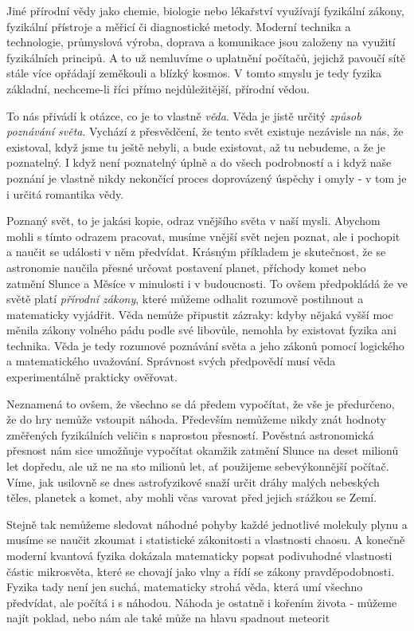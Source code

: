       Jiné přírodní vědy jako chemie, biologie nebo lékařství využívají fyzikální zákony, fyzikální
      přístroje a měřicí či diagnostické metody. Moderní technika a technologie, průmyslová výroba,
      doprava a komunikace jsou založeny na využití fyzikálních principů. A to už nemluvíme o
      uplatnění počítačů, jejichž pavoučí sítě stále více opřádají zeměkouli a blízký kosmos. V
      tomto smyslu je tedy fyzika základní, nechceme-li říci přímo nejdůležitější, přírodní vědou. 
      
      To nás přivádí k otázce, co je to vlastně \emph{věda}. Věda je jistě určitý \emph{způsob
      poznávání světa}. Vychází z přesvědčení, že tento svět existuje nezávisle na nás, že
      existoval, když jsme tu ještě nebyli, a bude existovat, až tu nebudeme, a že je poznatelný. I
      když není poznatelný úplně a do všech podrobností a i když naše poznání je vlastně nikdy
      nekončící proces doprovázený úspěchy i omyly - v tom je i určitá romantika vědy.  
      
      Poznaný svět, to je jakási kopie, odraz vnějšího světa v naší mysli. Abychom mohli s tímto
      odrazem pracovat, musíme vnější svět nejen poznat, ale i pochopit a naučit se události v něm
      předvídat. Krásným příkladem je skutečnost, že se astronomie naučila přesné určovat postavení
      planet, příchody komet nebo zatmění Slunce a Měsíce v minulosti i v budoucnosti. To ovšem
      předpokládá že ve světě platí \emph{přírodní zákony}, které můžeme odhalit rozumově postihnout
      a matematicky vyjádřit. Věda nemůže připustit zázraky: kdyby nějaká vyšší moc měnila zákony
      volného pádu podle své libovůle, nemohla by existovat fyzika ani technika. Věda je tedy
      rozumové poznávání světa a jeho zákonů pomocí logického a matematického uvažování. Správnost
      svých předpovědí musí věda experimentálně prakticky ověřovat.

      Neznamená to ovšem, že všechno se dá předem vypočítat, že vše je předurčeno, že do hry nemůže
      vstoupit náhoda. Především nemůžeme nikdy znát hodnoty změřených fyzikálních veličin s
      naprostou přesností. Pověstná astronomická přesnost nám sice umožňuje vypočítat okamžik
      zatmění Slunce na deset milionů let dopředu, ale už ne na sto milionů let, ať použijeme
      sebevýkonnější počítač. Víme, jak usilovně se dnes astrofyzikové snaží určit dráhy malých
      nebeských těles, planetek a komet, aby mohli včas varovat před jejich srážkou se Zemí.

      Stejně tak nemůžeme sledovat náhodné pohyby každé jednotlivé molekuly plynu a musíme se naučit
      zkoumat i statistické zákonitosti a vlastnosti chaosu. A konečně moderní kvantová fyzika
      dokázala matematicky popsat podivuhodné vlastnosti částic mikrosvěta, které se chovají jako
      vlny a řídí se zákony pravděpodobnosti. Fyzika tady není jen suchá, matematicky strohá věda,
      která umí všechno předvídat, ale počítá i s náhodou. Náhoda je ostatně i kořením života -
      můžeme najít poklad, nebo nám ale také může na hlavu spadnout meteorit

